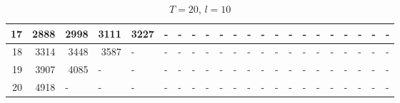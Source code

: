 \begin{appendices}
\begin{table}[H]
\begin{minipage}[b]{8.5cm}
\begin{turn}{90}
{\begin{tabular}{|r|r|r|r|r|r|r|r|r|r|r|r|l|l|l|l|l|l|l|l|l|l|}
17 & 2888 & 2998 & 3111 & 3227 & \multicolumn{1}{l|}{-} & \multicolumn{1}{l|}{-} & \multicolumn{1}{l|}{-} & \multicolumn{1}{l|}{-} & \multicolumn{1}{l|}{-} & \multicolumn{1}{l|}{-} & \multicolumn{1}{l|}{-} & - & - & - & - & - & - & - & - & - & - \\ \hline
18 & 3314 & 3448 & 3587 & \multicolumn{1}{l|}{-} & \multicolumn{1}{l|}{-} & \multicolumn{1}{l|}{-} & \multicolumn{1}{l|}{-} & \multicolumn{1}{l|}{-} & \multicolumn{1}{l|}{-} & \multicolumn{1}{l|}{-} & \multicolumn{1}{l|}{-} & - & - & - & - & - & - & - & - & - & - \\ \hline
19 & 3907 & 4085 & \multicolumn{1}{l|}{-} & \multicolumn{1}{l|}{-} & \multicolumn{1}{l|}{-} & \multicolumn{1}{l|}{-} & \multicolumn{1}{l|}{-} & \multicolumn{1}{l|}{-} & \multicolumn{1}{l|}{-} & \multicolumn{1}{l|}{-} & \multicolumn{1}{l|}{-} & - & - & - & - & - & - & - & - & - & - \\ \hline
20 & 4918 & \multicolumn{1}{l|}{-} & \multicolumn{1}{l|}{-} & \multicolumn{1}{l|}{-} & \multicolumn{1}{l|}{-} & \multicolumn{1}{l|}{-} & \multicolumn{1}{l|}{-} & \multicolumn{1}{l|}{-} & \multicolumn{1}{l|}{-} & \multicolumn{1}{l|}{-} & \multicolumn{1}{l|}{-} & - & - & - & - & - & - & - & - & - & - \\ \hline
\end{tabular}
}
\end{turn}
\caption{$T=20$, $l=10$}
 \end{minipage}
 \end{table}



\end{appendices}
